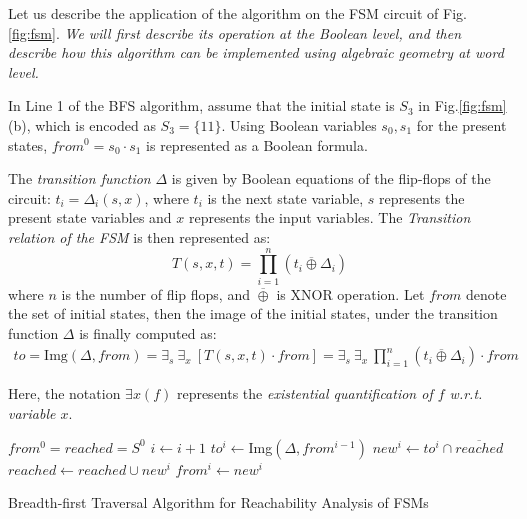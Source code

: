 Let us describe the application of the algorithm on the  FSM circuit
of Fig.\ref{fig:fsm}. {\it We will first describe its operation at the
Boolean level, and then describe how this algorithm can be implemented
using algebraic geometry at word level.} 


In Line 1 of the BFS algorithm, assume that the initial state
is $S_3$ in Fig.\ref{fig:fsm}(b), which is encoded as 
$S_3 = \{11\}$. Using Boolean variables $s_0, s_1$ for the present
states, $from^0 = s_0\cdot s_1$ is represented as a Boolean formula. 


The {\it transition function} $\Delta$ is given by Boolean equations
  of the flip-flops of the circuit: $t_i = \Delta_i(s, x)$, where
  $t_i$ is the next state variable, $s$ represents the present   state
  variables and $x$ represents the input variables. 
The {\it Transition relation of the FSM} is then represented as: 
\begin{equation} 
T(s, x, t) =   \prod_{i=1}^{n} (t_i \overline{\oplus } \Delta_i)
\end{equation}
where $n$ is the number of flip flops, and $\overline{\oplus}$ is XNOR
operation. Let $from$ denote the set of initial states, then the
image of the initial states, under the transition function $\Delta$ is
finally computed as:
\begin{align}
\label{img}
to = \text{Img}(\Delta, from) = \exists _s ~\exists _x ~[ T(s, x, t)
  \cdot from ] = \exists _s ~\exists _x ~\prod_{i=1}^{n} (t_i
\overline{\oplus } \Delta_i)\cdot from
\end{align}

Here, the notation $\exists x (f)$ represents the {\it existential
  quantification of $f$ w.r.t. variable $x$}. 

\begin{algorithm}[hbt]
\SetAlgoNoLine

  $from^0 = reached = S^0$\;
  {
  	$i \gets i + 1$\;
	$to^i \gets$Img$(\Delta, from^{i-1})$\;
	$new^i \gets to^i \cap \overline{reached}$\;
  	$reached \gets reached \cup new^i$\;
	$from^i \gets new^i$\;
  }
\caption {Breadth-first Traversal Algorithm for Reachability Analysis of FSMs}\label{alg:BFS}
\end{algorithm}


